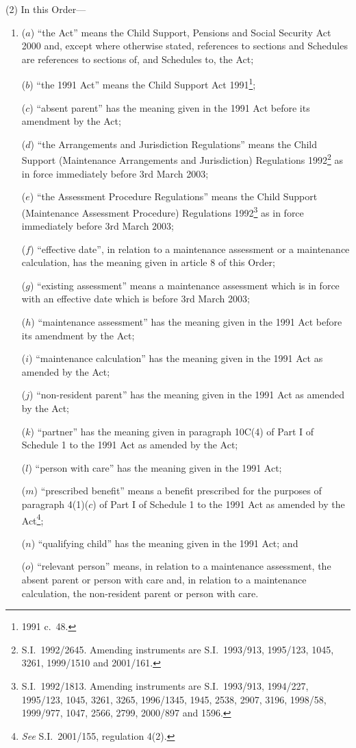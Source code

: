 \documentclass[12pt,a4paper]{article}
\begin{document}
(2) In this Order—
\begin{enumerate}\item[]
($a$) “the Act” means the Child Support, Pensions and Social Security Act 2000 and, except where otherwise stated, references to sections and Schedules are references to sections of, and Schedules to, the Act;

($b$) “the 1991 Act” means the Child Support Act 1991\footnote{1991 c.\ 48.};

($c$) “absent parent” has the meaning given in the 1991 Act before its amendment by the Act;

($d$) “the Arrangements and Jurisdiction Regulations” means the Child Support (Maintenance Arrangements and Jurisdiction) Regulations 1992\footnote{S.I.\ 1992/2645. Amending instruments are S.I.\ 1993/913, 1995/123, 1045, 3261, 1999/1510 and 2001/161.} as in force immediately before 3rd March 2003;

($e$) “the Assessment Procedure Regulations” means the Child Support (Maintenance Assessment Procedure) Regulations 1992\footnote{S.I.\ 1992/1813. Amending instruments are S.I.\ 1993/913, 1994/227, 1995/123, 1045, 3261, 3265, 1996/1345, 1945, 2538, 2907, 3196, 1998/58, 1999/977, 1047, 2566, 2799, 2000/897 and 1596.} as in force immediately before 3rd March 2003;

($f$) “effective date”, in relation to a maintenance assessment or a maintenance calculation, has the meaning given in article 8 of this Order;

($g$) “existing assessment” means a maintenance assessment which is in force with an effective date which is before 3rd March 2003;

($h$) “maintenance assessment” has the meaning given in the 1991 Act before its amendment by the Act;

($i$) “maintenance calculation” has the meaning given in the 1991 Act as amended by the Act;

($j$) “non-resident parent” has the meaning given in the 1991 Act as amended by the Act;

($k$) “partner” has the meaning given in paragraph 10C(4) of Part I of Schedule 1 to the 1991 Act as amended by the Act;

($l$) “person with care” has the meaning given in the 1991 Act;

($m$) “prescribed benefit” means a benefit prescribed for the purposes of paragraph 4(1)($c$)  of Part I of Schedule 1 to the 1991 Act as amended by the Act\footnote{\emph{See} S.I.\ 2001/155, regulation 4(2).};

($n$) “qualifying child” has the meaning given in the 1991 Act; and

($o$) “relevant person” means, in relation to a maintenance assessment, the absent parent or person with care and, in relation to a maintenance calculation, the non-resident parent or person with care.
\end{enumerate}
\end{document}
